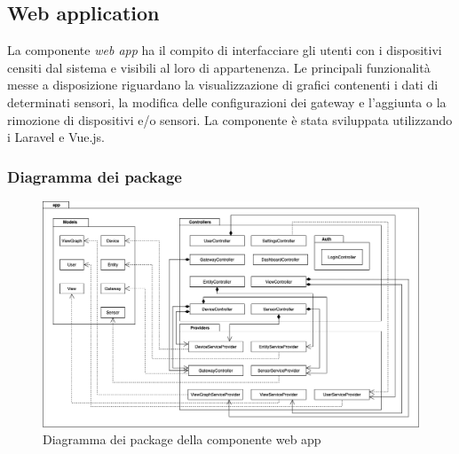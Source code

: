 \subsection{Web application}
	La componente \textit{web app} ha il compito di interfacciare gli utenti con i dispositivi censiti dal sistema e visibili al loro  di appartenenza.
	\newline
	Le principali funzionalità messe a disposizione riguardano la visualizzazione di grafici contenenti i dati di determinati sensori, la modifica delle configurazioni dei gateway e l'aggiunta o la rimozione di dispositivi e/o sensori.
	\newline 
	La componente è stata sviluppata utilizzando i  Laravel e Vue.js.
	
	\subsubsection{Diagramma dei package}%
		\begin{figure}[H]
			\centering
			\includegraphics[scale=0.450]{res/images/WEBAPP/WebAppPackage.png}
			\caption{Diagramma dei package della componente web app}
			\label{Diagramma 21}
		\end{figure}
	
